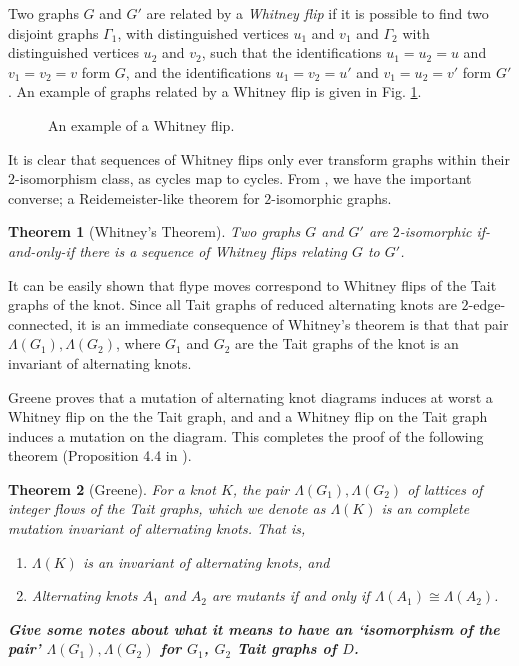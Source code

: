 \documentclass[12pt]{report}
\newcommand{\notered}[1]{{\color{Red} \textbf{#1}}}
\newtheorem*{theorem}{Theorem}
\begin{document}
Two graphs $G$ and $G'$ are related by a \textit{Whitney flip} if it is possible to find two disjoint graphs $\Gamma_{1}$, with distinguished vertices $u_{1}$ and $v_{1}$ and $\Gamma_{2}$ with distinguished vertices $u_{2}$ and $v_{2}$, such that the identifications $u_{1} = u_{2} = u$ and $v_{1} = v_{2} = v$ form $G$, and the identifications $u_{1} = v_{2} = u'$ and $v_{1} = u_{2} = v'$ form $G'$. An example of graphs related by a Whitney flip is given in Fig. \ref{fig:whitney_flip}.

\begin{figure}[hbt]
	\centering
	\def\svgscale{0.5}
	
	
	\caption{An example of a Whitney flip.}
	\label{fig:whitney_flip}
\end{figure}

It is clear that sequences of Whitney flips only ever transform graphs within their $2$-isomorphism class, as cycles map to cycles. From \cite{2-isomorphic-graphs}, we have the important converse; a Reidemeister-like theorem for $2$-isomorphic graphs.

\begin{theorem}[Whitney's Theorem]
Two graphs $G$ and $G'$ are $2$-isomorphic if-and-only-if there is a sequence of Whitney flips relating $G$ to $G'$.
\end{theorem}

It can be easily shown that flype moves correspond to Whitney flips of the Tait graphs of the knot. Since all Tait graphs of reduced alternating knots are $2$-edge-connected, it is an immediate consequence of Whitney's theorem is that that pair $\Lambda(G_{1}), \Lambda(G_{2})$, where $G_{1}$ and $G_{2}$ are the Tait graphs of the knot is an invariant of alternating knots.

Greene proves that a mutation of alternating knot diagrams induces at worst a Whitney flip on the the Tait graph, and and a Whitney flip on the Tait graph induces a mutation on the diagram. This completes the proof of the following theorem (Proposition 4.4 in \cite{lattices-graphs-mutation}).

\begin{theorem}[Greene]
For a knot $K$, the pair $\Lambda(G_{1}), \Lambda(G_{2})$ of lattices of integer flows of the Tait graphs, which we denote as $\Lambda(K)$ is an complete mutation invariant of alternating knots. That is,
\begin{enumerate}[(1)]
\item $\Lambda(K)$ is an invariant of alternating knots, and
\item Alternating knots $A_{1}$ and $A_{2}$ are mutants if and only if $\Lambda(A_{1}) \cong \Lambda(A_{2})$.
\end{enumerate}
\notered{Give some notes about what it means to have an `isomorphism of the pair' $\Lambda(G_{1}), \Lambda(G_{2})$ for $G_{1}$, $G_{2}$ Tait graphs of $D$.}

\end{theorem}
\end{document}
